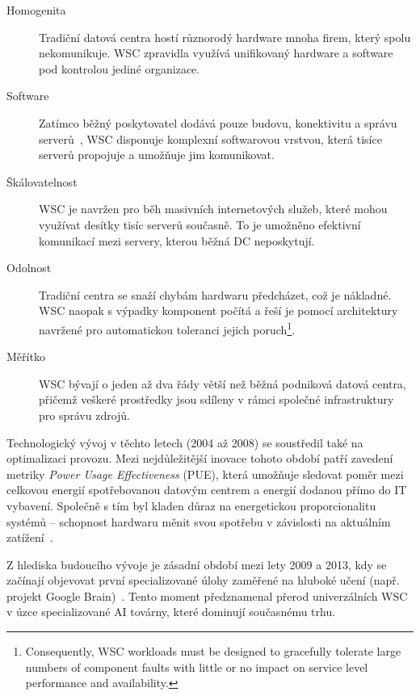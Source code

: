 \begin{description}
    \item[Homogenita] Tradiční datová centra hostí různorodý hardware mnoha firem, který spolu nekomunikuje. WSC zpravidla využívá unifikovaný hardware a software pod kontrolou jediné organizace.
    
    \item[Software] Zatímco běžný poskytovatel dodává pouze budovu, konektivitu a správu serverů~\cite[s. 10]{marx_gomez_foundations_2017}, WSC disponuje komplexní softwarovou vrstvou, která tisíce serverů propojuje a umožňuje jim komunikovat.
    
    \item[Škálovatelnost] WSC je navržen pro běh masivních internetových služeb, které mohou využívat desítky tisíc serverů současně. To je umožněno efektivní komunikací mezi servery, kterou běžná DC neposkytují.
    
    \item[Odolnost] Tradiční centra se snaží chybám hardwaru předcházet, což je nákladné. WSC naopak s výpadky komponent počítá a řeší je pomocí architektury navržené pro automatickou toleranci jejich poruch\footnote{Consequently, WSC workloads must be designed to gracefully tolerate large numbers of component faults with little or no impact on service level performance and availability.\cite{barroso_data_2026}}.
    
    \item[Měřítko] WSC bývají o jeden až dva řády větší než běžná podniková datová centra, přičemž veškeré prostředky jsou sdíleny v rámci společné infrastruktury pro správu zdrojů.
\end{description}

Technologický vývoj v těchto letech (2004 až 2008) se soustředil také na optimalizaci provozu. Mezi nejdůležitější inovace tohoto období patří zavedení metriky \textit{Power Usage Effectiveness} (PUE), která umožňuje sledovat poměr mezi celkovou energií spotřebovanou datovým centrem a energií dodanou přímo do IT vybavení. Společně s tím byl kladen důraz na energetickou proporcionalitu systémů -- schopnost hardwaru měnit svou spotřebu v závislosti na aktuálním zatížení~\cite{ranganathan_twenty_2024}.

Z hlediska budoucího vývoje je zásadní období mezi lety 2009 a 2013, kdy se začínají objevovat první specializované úlohy zaměřené na hluboké učení (např. projekt Google Brain)~\cite{ranganathan_twenty_2024}. Tento moment předznamenal přerod univerzálních WSC v úzce specializované AI továrny, které dominují současnému trhu.

